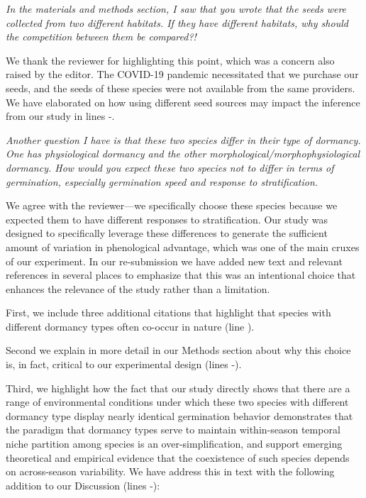 \documentclass[11pt]{article}
\begin{document}
\emph{In the materials and methods section, I saw that you wrote that the seeds were collected from two different habitats. If they have different habitats, why should the competition between them be compared?!}

We thank the reviewer for highlighting this point, which was a concern also raised by the editor. The COVID-19 pandemic necessitated that we purchase our seeds, and the seeds of these species were not available from the same providers. We have elaborated on how using different seed sources may impact the inference from our study in lines -.

\emph{Another question I have is that these two species differ in their type of dormancy. One has physiological dormancy and the other morphological/morphophysiological dormancy. How would you expect these two species not to differ in terms of germination, especially germination speed and response to stratification.}

We agree with the reviewer---we specifically choose these species because we expected them to have different responses to stratification. 
Our study was designed to specifically leverage these differences to generate the sufficient amount of variation in phenological advantage, which was one of the main cruxes of our experiment. In our re-submission we have added new text and relevant references in several places to emphasize that this was an intentional choice that enhances the relevance of the study rather than a limitation.

First, we include three additional citations that highlight that species with different dormancy types often co-occur in nature (line ).

Second we explain in more detail in our Methods section about why this choice is, in fact, critical to our experimental design (lines -).

Third, we highlight how the fact that our study directly shows that there are a range of environmental conditions under which these two species with different dormancy type display nearly identical germination behavior demonstrates that the paradigm that dormancy types serve to maintain within-season temporal niche partition among species is an over-simplification, and support emerging theoretical and empirical evidence that the coexistence of such species depends on across-season variability. We have address this in text with the following addition to our Discussion (lines -):
\end{document}
